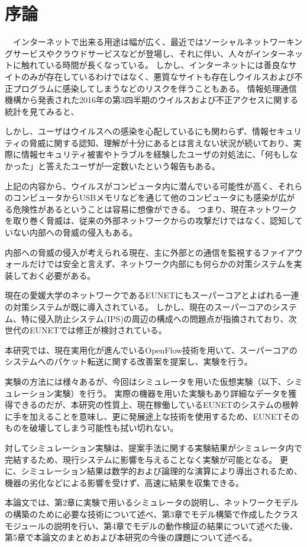 \chapter{序論}

　インターネットで出来る用途は幅が広く、最近ではソーシャルネットワーキングサービスやクラウドサービスなどが登場し、それに伴い、人々がインターネットに触れている時間が長くなっている。
しかし、インターネットには善良なサイトのみが存在しているわけではなく、悪質なサイトも存在しウイルスおよび不正プログラムに感染してしまうなどのリスクを伴うこともある。
情報処理通信機構から発表された2016年の第3四半期のウイルスおよび不正アクセスに関する統計を見てみると、

しかし、ユーザはウイルスへの感染を心配しているにも関わらず、情報セキュリティの脅威に関する認知、理解が十分にあるとは言えない状況が続いており、実際に情報セキュリティ被害やトラブルを経験したユーザの対処法に、「何もしなかった」と答えたユーザが一定数いたという報告もある\cite{joron1}。

上記の内容から、ウイルスがコンピュータ内に潜んでいる可能性が高く、それらのコンピュータからUSBメモリなどを通じて他のコンピュータにも感染が広がる危険性があるということは容易に想像ができる。
つまり、現在ネットワークを取り巻く脅威は、従来の外部ネットワークからの攻撃だけではなく、認知していない内部への脅威の侵入もある。

内部への脅威の侵入が考えられる現在、主に外部との通信を監視するファイアウォールだけでは安全と言えず、ネットワーク内部にも何らかの対策システムを実装しておく必要がある。

現在の愛媛大学のネットワークであるEUNETにもスーパーコアとよばれる一連の対策システムが既に導入されている。
しかし、現在のスーパーコアのシステム、特に侵入防止システム(IPS)の周辺の構成への問題点が指摘されており、次世代のEUNETでは修正が検討されている。

本研究では、現在実用化が進んでいるOpenFlow技術を用いて、スーパーコアのシステムへのパケット転送に関する改善案を提案し、実験を行う。

実験の方法には様々あるが、今回はシミュレータを用いた仮想実験（以下、シミュレーション実験）を行う。
実際の機器を用いた実験もあり詳細なデータを獲得できるのだが、本研究の性質上、現在稼働しているEUNETのシステムの根幹に手を加えることを意味し、更に発展途上な技術を使用するため、EUNETそのものを破壊してしまう可能性も拭い切れない。

対してシミュレーション実験は、提案手法に関する実験結果がシミュレータ内で完結するため、現行システムに影響を与えることなく実験が可能となる。
更に、シミュレーション結果は数学的および論理的な演算により導出されるため、機器の劣化などによる影響を受けず、高速に結果を収集できる。

本論文では、第2章に実験で用いるシミュレータの説明し、ネットワークモデルの構築のために必要な技術について述べ、第3章でモデル構築で作成したクラスモジュールの説明を行い、第4章でモデルの動作検証の結果について述べた後、第5章で本論文のまとめおよび本研究の今後の課題について述べる。